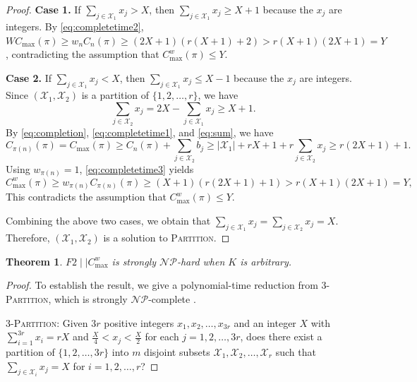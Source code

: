 \documentclass[12pt]{article}
\newtheorem{theorem}{Theorem}[section]
\begin{document}
\begin{sloppypar}
\begin{proof}
            \textbf{Case 1.} If $\sum_{j \in \mathcal{X}_1} x_j > X$, then $\sum_{j \in \mathcal{X}_1} x_j \geq X+1$ because the $x_j$ are integers. By \cref{eq:completetime2}, $W C_{\max}(\pi) \geq w_n C_n(\pi) \geq (2X+1) (r(X+1)+2) >r(X+1)(2X+1)=Y$, contradicting the assumption that $C_{\max}^w(\pi) \leq Y$.  
            
            \textbf{Case 2.} If $\sum_{j \in \mathcal{X}_1} x_j < X$, then $\sum_{j \in \mathcal{X}_1} x_j \leq X-1$ because the $x_j$ are integers. Since $(\mathcal{X}_1, \mathcal{X}_2)$ is a partition of $\{1, 2, \ldots, r\}$, we have 
            \begin{equation} \label{eq:sum}
                \sum_{j \in \mathcal{X}_2} x_j =2X-\sum_{j \in \mathcal{X}_1} x_j \geq X+1.
            \end{equation} 
            By \cref{eq:completion}, \cref{eq:completetime1}, and \cref{eq:sum}, we have 
            \begin{equation}\label{eq:completetime3}
                C_{\pi(n)}(\pi)=C_{\max}(\pi) \geq C_n(\pi)+\sum_{j \in \mathcal{X}_2} b_j \geq |\mathcal{X}_1| +r X + 1+ r \sum_{j \in \mathcal{X}_2} x_j \geq r (2X + 1)+1.
            \end{equation}
            Using $w_{\pi(n)}=1$, \cref{eq:completetime3} yields
            \begin{equation*}
                C_{\max}^w(\pi) \geq w_{\pi(n)} C_{\pi(n)}(\pi) \geq (X+1) (r(2X+1)+1) >r(X+1)(2X+1)=Y,
            \end{equation*} 
            This contradicts the assumption that $C_{\max}^w(\pi) \leq Y$. 
            
            Combining the above two cases, we obtain that $\sum_{j \in \mathcal{X}_1} x_j = \sum_{j \in \mathcal{X}_2} x_j= X$. Therefore, $(\mathcal{X}_1, \mathcal{X}_2)$ is a solution to \textsc{Partition}.       
        \end{proof}
        
        \begin{theorem}\label{thm:snphard}
            $F2 \mid \mid C_{\max}^w$ is strongly $\mathcal{NP}$-hard when $K$ is arbitrary.
        \end{theorem}
        \begin{proof}
            To establish the result, we give a polynomial-time reduction from 3-\textsc{Partition}, which is strongly  $\mathcal{NP}$-complete \citep{GareyJohnson1979computer}.
            
            3-\textsc{Partition}: Given $3r$ positive integers $x_1, x_2, \ldots, x_{3r}$ and an integer $X$ with
            $\sum_{i=1}^{3r}x_i=rX$ and $\frac{X}{4} < x_j < \frac{X}{2}$ for each $j=1, 2, \ldots, 3r$, does there exist a partition of $\{1, 2, \ldots, 3r\}$ into $m$ disjoint subsets $\mathcal{X}_1, \mathcal{X}_2, \ldots, \mathcal{X}_r$ such that $\sum_{j \in \mathcal{X}_i} x_j=X$ for $i=1, 2, \ldots, r$?
            

\end{proof}
\end{sloppypar}
\end{document}
